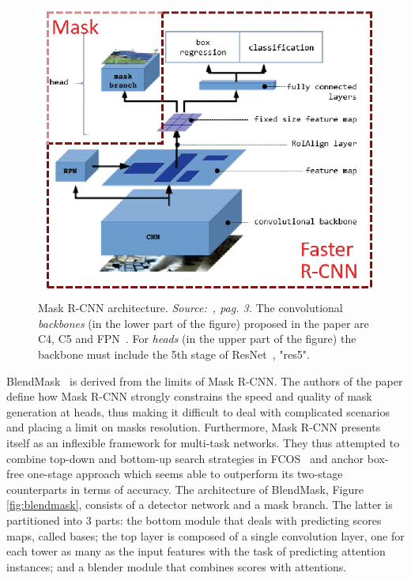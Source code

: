 \documentclass[10pt,twocolumn,letterpaper]{article}
\begin{document}
\begin{figure}[H]
\centering
  \includegraphics[width=0.69\linewidth]{./image/maskrcnn.png}
  \caption{Mask R-CNN architecture. \textit{Source:~\cite{fig1}, pag. 3.} The convolutional \textit{backbones} (in the lower part of the figure) proposed in the paper are C4, C5 and FPN~\cite{FPN}. For \textit{heads} (in the upper part of the figure) the backbone must include the 5th stage of ResNet~\cite{Authors5_ResNet}, "res5".}%
  \label{fig:mask_rcnn}
\noindent
\end{figure}
\indent BlendMask~\cite{Authors2_BlendMask} is derived from the limits of Mask R-CNN. The authors of the paper define how Mask R-CNN strongly constrains the speed and quality of mask generation at heads, thus making it difficult to deal with complicated scenarios and placing a limit on masks resolution. Furthermore, Mask R-CNN presents itself as an inflexible framework for multi-task networks. They thus attempted to combine top-down and bottom-up search strategies in FCOS~\cite{fcos} and anchor box-free one-stage approach which seems able to outperform its two-stage counterparts in terms of accuracy. The architecture of BlendMask, Figure \ref{fig:blendmask}, consists of a detector network and a mask branch. The latter is partitioned into 3 parts: the bottom module that deals with predicting scores maps, called bases; the top layer is composed of a single convolution layer, one for each tower as many as the input features with the task of predicting attention instances; and a blender module that combines scores with attentions.
\end{document}
